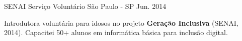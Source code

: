 

\begin{cventries}

  \cventry
    {SENAI} %
    {Serviço Voluntário} %
    {São Paulo - SP} %
    {Jun. 2014} %
    {
      \begin{cvitems} %
        \item {Introdutora voluntária para idosos no projeto \textbf{Geração Inclusiva} (SENAI, 2014). Capacitei 50+ alunos em informática básica para inclusão digital.}
      \end{cvitems}
    }

\end{cventries}
